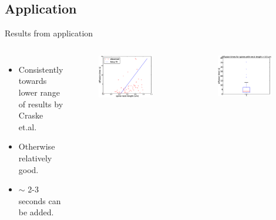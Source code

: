 \documentclass[12pt,a4paper, xcolor={usenames,dvipsnames,svgnames,table}]{beamer}
\begin{document}
\subsection{Application}
\begin{frame}[shrink]{Results from application}
\begin{columns}
 \begin{itemize}
  \item <2-> Consistently towards lower range of results by Craske et.al.
  \item <3-> Otherwise relatively good.
  \item <4-> $\sim$ 2-3 seconds can be added.
 \end{itemize}
 \begin{figure}[H]
  \centering
  \includegraphics[width=0.9\textwidth]{../Figures/spine_stats_reltime_nl.eps}
 \end{figure}
 \begin{figure}[H]
  \centering
  \includegraphics[width=0.9\textwidth]{../Figures/spine_stats_boxplot_reltime_longneck.eps}
 \end{figure}
\end{columns}

\end{frame}
\notetoself{}
\end{document}
